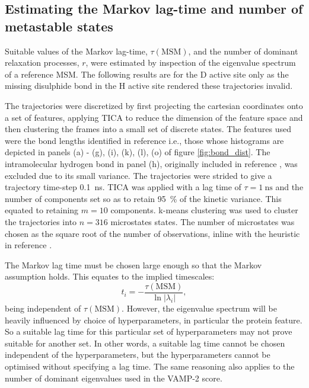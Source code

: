 \subsection{Estimating the Markov lag-time and number of metastable states}\label{sec:aadh_est_tau_k}

Suitable values of the Markov lag-time, $\tau(\mathrm{MSM})$, and  the number of dominant relaxation processes, $r$, were estimated by inspection of the eigenvalue spectrum of a reference MSM. The following results are for the D active site only as the missing disulphide bond in the H active site rendered these trajectories invalid.

The trajectories were discretized by first projecting the cartesian coordinates onto a set of features, applying TICA to reduce the dimension of the feature space and then clustering the frames into a small set of discrete states.  The features used were the bond lengths identified in reference \cite{ranaghanInitioQMMM2017} i.e., those whose histograms are depicted in panels (a) - (g), (i), (k), (l), (o) of figure \ref{fig:bond_dist}. The intramolecular hydrogen bond in panel (h), originally included in reference \cite{ranaghanInitioQMMM2017}, was excluded due to its small variance. The trajectories were strided to give a trajectory time-step \SI{0.1}{\nano\second}. TICA was applied with a lag time of $\tau=\SI{1}{\nano\second}$ and the number of components set so as to retain \SI{95}{\percent} of the kinetic variance. This equated to retaining $m=10$ components. k-means clustering was used to cluster the trajectories into $n = 316$ microstates states. The number of microstates was chosen as the square root of the number of observations, inline with the heuristic in reference  \cite{husicWardClusteringImproves2017a}. 

The Markov lag time must be chosen large enough so that the Markov assumption holds. This equates to the implied timescales:
\begin{equation*}
    t_{i}=-\frac{\tau(\mathrm{MSM})}{\ln{|\lambda_{i}|}}, 
\end{equation*} 
being independent of $\tau(\mathrm{MSM})$. However, the eigenvalue spectrum will be heavily influenced by choice of hyperparameters, in particular the protein feature. So a suitable lag time for this particular set of hyperparameters may not prove suitable for another set. In other words, a suitable lag time cannot be chosen independent of the hyperparameters, but the hyperparameters cannot be optimised without specifying a lag time. The same reasoning also applies to the number of dominant eigenvalues used in the VAMP-2 score. 

